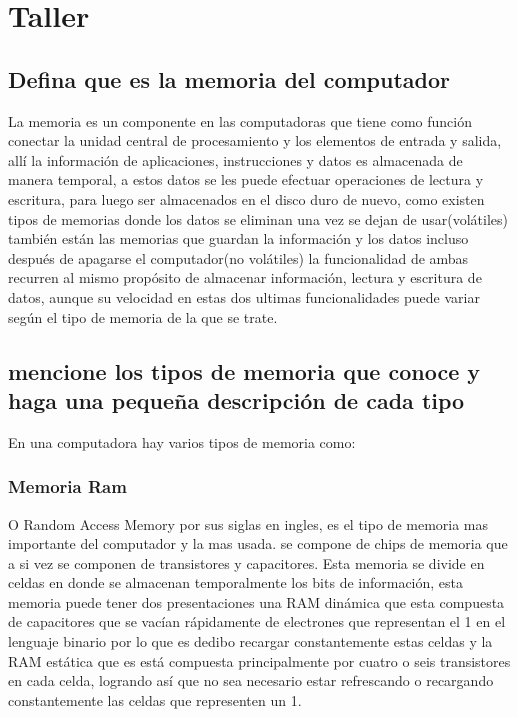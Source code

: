 \documentclass{article}
\begin{document}
\newpage
\section{Taller}

    \subsection{Defina que es la memoria del computador}
    La memoria es un componente en las computadoras que tiene como función conectar la unidad central de procesamiento y los elementos de entrada y salida, allí  la información de aplicaciones, instrucciones y datos es almacenada de manera temporal, a estos datos se les puede efectuar operaciones de lectura y escritura, para luego ser almacenados en el disco duro de nuevo, como existen tipos de memorias donde los datos se eliminan una vez se dejan de usar(volátiles) también están las memorias que guardan la información y los datos incluso después de apagarse el computador(no volátiles) la funcionalidad de ambas recurren al mismo propósito de almacenar información, lectura y escritura de datos, aunque su velocidad en estas dos ultimas funcionalidades puede variar según el tipo de memoria de la que se trate. 
    
    \subsection{mencione los tipos de memoria que conoce y haga una pequeña descripción de cada tipo}
    En una computadora hay varios tipos de memoria como: 
    
        \subsubsection{Memoria Ram}
        O Random Access Memory por sus siglas en ingles, es el tipo de memoria mas importante del computador y la mas usada. se compone de chips de memoria que a si vez se componen de transistores y capacitores. Esta memoria se divide en celdas en donde se almacenan temporalmente los bits de información, esta memoria puede tener dos presentaciones una RAM dinámica que esta compuesta de capacitores que se vacían rápidamente de electrones que representan el 1 en el lenguaje binario por lo que es dedibo recargar constantemente estas celdas y la RAM estática que es está compuesta principalmente por cuatro o seis transistores en cada celda, logrando así que no sea necesario estar refrescando o recargando constantemente las celdas que representen un 1.
        
\end{document}
